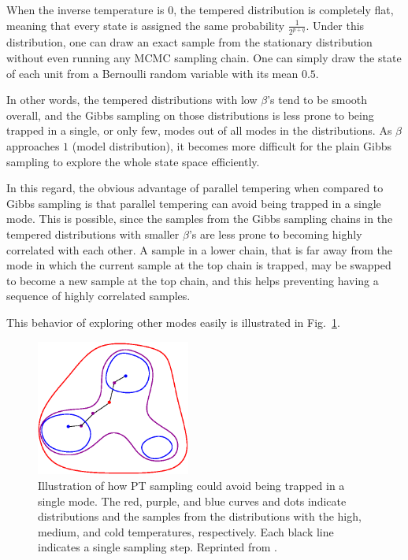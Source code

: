 \documentclass[dissertation,nocontribution,draft*]{aaltoseries}
\begin{document}
When the inverse temperature is $0$, the tempered
distribution is completely flat, meaning that every state is
assigned the same probability $\frac{1}{2^{p+q}}$. Under
this distribution, one can draw an exact sample from the
stationary distribution without even running any MCMC
sampling chain. One can simply draw the state of each unit
from a Bernoulli random variable with its mean $0.5$. 

In other words, the tempered distributions with low
$\beta$'s tend to be smooth overall, and the Gibbs sampling
on those distributions is less prone to being trapped in a
single, or only few, modes out of all modes in the
distributions. As $\beta$ approaches $1$ (model
distribution), it becomes more difficult for the plain Gibbs
sampling to explore the whole state space efficiently.

In this regard, the obvious advantage of parallel
tempering when compared to Gibbs sampling is that 
parallel tempering can avoid being trapped in a single mode.
This is possible, since the samples from the Gibbs sampling
chains in the tempered distributions with smaller $\beta$'s
are less prone to becoming highly correlated with each other.
A sample in a lower chain, that is far away from the mode
in which the current sample at the top chain is trapped, may be
swapped to become a new sample at the top chain, and this
helps preventing having a sequence of highly correlated
samples. 

This behavior of exploring other modes easily is illustrated
in Fig.~\ref{fig:pt_escape}.

\begin{figure}[t]
    \centering
    \includegraphics[width=0.45\textwidth]{figures/pt.eps}
    \caption{Illustration of how PT sampling could avoid
    being trapped in a single mode. The red, purple, and
    blue curves and dots indicate distributions and the
    samples from the distributions with the high, medium,
    and cold temperatures, respectively. Each black line
    indicates a single sampling step. Reprinted from
    \citep{Cho2011t}.}
    \label{fig:pt_escape}
\end{figure}
\end{document}
